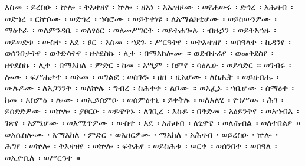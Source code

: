 \begin{ethiopictext}
    እስመ~፡ ይረስዑ~፡ ኵሎ~፡ ትእዛዝየ~፡ 
    ኵሎ~፡ ዘአነ~፡ እኤዝዞሙ~፡ ወየሐውሩ~፡ ድኅረ~፡ አሕዛብ~፡ ወድኅረ~፡
    ርኵሶሙ~፡ ወድኅረ~፡ ኀሳሮሙ~፡ ወይትቀነዩ~፡ ለአማልክቲሆሙ~፡ 
    ወይከውንዎሙ~፡ ማዕቀፈ~፡ ወለምንዳቤ~፡ ወለፃዕር~፡ ወለመሥገርት~፡
    ወይትሐጐሉ~፡ ብዙኃን~፡ ወይትአኀዙ~፡ ወይወድቁ~፡ ውስተ~፡
    እደ~፡ ፀር~፡ እስመ~፡ ኀደጉ~፡ ሥርዓትየ~፡ ወትእዛዝየ~፡ ወበዓላተ~፡
    ኪዳንየ~፡ ወሰንበታትየ~፡ ወቅድሳትየ~፡ ዘቀደስኩ~፡ ሊተ~፡ በማእከሎሙ~።
    ወደብተራየ~፡ ወመቅደስየ~፡ ዘቀደስኩ~፡ ሊተ~፡ በማእከለ~፡
    ምድር~፡ ከመ~፡ እሢም~፡ ስምየ~፡ ሳዕሌሁ~፡ ወይኅድር~።
    ወገብሩ~፡
    ሎሙ~፡ ፍሥሐታተ~፡ ወኦመ~፡ ወግልፎ : ወሰገዱ~፡ ዘዘ~፡ ዚአሆሙ~፡ 
    ለስሒት~፡ ወይዘብሑ~፡ ውሉዶሙ~፡ ለአጋንንት~፡ ወለኵሉ~፡ ግብረ~፡
    ስሕተተ~፡ ልቦሙ~።
    ወእፌኑ~፡ ኀቤሆሙ~፡ ሰማዕተ~፡ ከመ~፡
    አስምዕ~፡ ሎሙ~፡ ወኢይሰምዑ~፡ ወሰምዕተኒ~፡ ይቀትሉ~፡ ወለእለሂ~፡
    የኀሥሡ~፡ ሕገ~፡ ይሰድድዎሙ~፡ ወኵሎ~፡ ያፀርዑ~፡ ወይዌጥኑ~፡ ለገቢረ~፡
    እኩይ~፡ በቅድመ~፡ አዕይንትየ~፡
    ወአኀብእ~፡ ገጽየ~፡
    እምኔሆሙ~፡ ወእሜጥዎሙ~፡ ውስተ~፡ እደ~፡ አሕዛብ~፡ ለፂዋዌ~፡
    ወለሕብል~፡ ወለተበልዖ~። ወአሴስሎሙ~፡ እማእከለ~፡ ምድር~፡
    ወእዘርዎሙ~፡ ማእከለ~፡ አሕዛብ~፡
    ወይረስዑ~፡ ኵሎ~፡ ሕግየ~፡
    ወኵሎ~፡ ትእዛዝየ~፡ ወኵሎ~፡ ፍትሕየ~፡ ወይስሕቱ~፡ ሠርቀ~፡ ወሰንበተ~፡
    ወበዓለ~፡ ወኢዮቤለ~፡ ወሥርዓተ~።
\end{ethiopictext}

